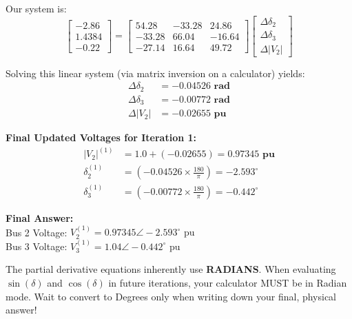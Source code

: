 \documentclass[11pt]{article}
\begin{document}
\begin{stepbox}
Our system is:
\begin{equation*}
\begin{bmatrix} -2.86 \\ 1.4384 \\ -0.22 \end{bmatrix} 
= 
\begin{bmatrix} 
54.28 & -33.28 & 24.86 \\ 
-33.28 & 66.04 & -16.64 \\ 
-27.14 & 16.64 & 49.72 
\end{bmatrix} 
\begin{bmatrix} \Delta \delta_2 \\ \Delta \delta_3 \\ \Delta |V_2| \end{bmatrix}
\end{equation*}

Solving this linear system (via matrix inversion on a calculator) yields:
\begin{align*}
    \Delta \delta_2 &= \mathbf{-0.04526 \text{ rad}} \\
    \Delta \delta_3 &= \mathbf{-0.00772 \text{ rad}} \\
    \Delta |V_2| &= \mathbf{-0.02655 \text{ pu}}
\end{align*}

\textbf{Final Updated Voltages for Iteration 1:}
\begin{align*}
    |V_2|^{(1)} &= 1.0 + (-0.02655) = \mathbf{0.97345 \text{ pu}} \\
    \delta_2^{(1)} &= \left(-0.04526 \times \frac{180}{\pi}\right) = \mathbf{-2.593^\circ} \\
    \delta_3^{(1)} &= \left(-0.00772 \times \frac{180}{\pi}\right) = \mathbf{-0.442^\circ}
\end{align*}

\textbf{Final Answer:} \\
Bus 2 Voltage: $V_2^{(1)} = 0.97345 \angle -2.593^\circ \text{ pu}$ \\
Bus 3 Voltage: $V_3^{(1)} = 1.04 \angle -0.442^\circ \text{ pu}$
\end{stepbox}

\begin{examtrap}
The partial derivative equations inherently use \textbf{RADIANS}. When evaluating $\sin(\delta)$ and $\cos(\delta)$ in future iterations, your calculator MUST be in Radian mode. Wait to convert to Degrees only when writing down your final, physical answer!
\end{examtrap}
\end{document}
